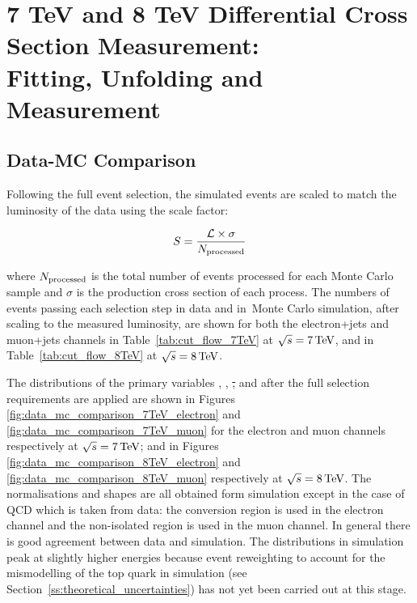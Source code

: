\chapter{7 TeV and 8 TeV Differential Cross Section Measurement: \\ Fitting, Unfolding and Measurement}
\label{c:Differential_Cross_Section:fitting_unfolding_and_measurement}


\section{Data-MC Comparison}
\label{ss:data-mc_comparison}
Following the full event selection, the simulated events are scaled to match the luminosity of the data using
the scale factor:

\begin{equation}
  S = \frac{{\cal L} \times  \sigma}{N_{\rm processed}}
\end{equation}

where $N_{\rm processed}$ is the total number of events processed for each Monte Carlo sample and $\sigma$ is
the production cross section of each process. The numbers of events passing each selection step in data and
in Monte Carlo simulation, after scaling to the measured luminosity, are shown for both the electron+jets and
muon+jets channels in Table~\ref{tab:cut_flow_7TeV} at $\sqrt{s}=7\,\text{Te\hspace{-.08em}V}$, and in Table~\ref{tab:cut_flow_8TeV}
at $\sqrt{s}=8\,\text{Te\hspace{-.08em}V}$.




The distributions of the primary variables \met, \HT, \st, \wpt and \mt after the full selection requirements
are applied are shown in Figures \ref{fig:data_mc_comparison_7TeV_electron} and
\ref{fig:data_mc_comparison_7TeV_muon} for the electron and muon channels respectively at $\sqrt{s}=7\,\text{Te\hspace{-.08em}V}$; and
in Figures \ref{fig:data_mc_comparison_8TeV_electron} and \ref{fig:data_mc_comparison_8TeV_muon} respectively
at $\sqrt{s}=8\,\text{Te\hspace{-.08em}V}$. The normalisations and shapes are all obtained form simulation except in the case of QCD
which is taken from data: the conversion region is used in the electron channel and the non-isolated region is
used in the muon channel. In general there is good agreement between data and simulation. The distributions in
simulation peak at slightly higher energies because event reweighting to account for the \pt mismodelling of
the top quark in simulation (see Section~\ref{ss:theoretical_uncertainties}) has not yet been carried out at
this stage.


